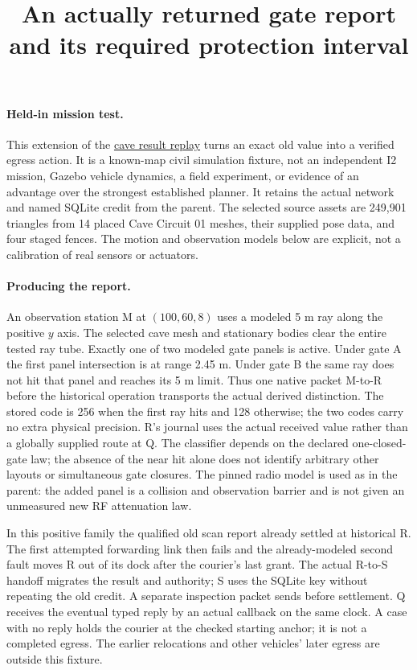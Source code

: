 \documentclass{article}
\title{An actually returned gate report and its required protection interval}
\author{}
\date{}
\begin{document}
\maketitle
\paragraph{Held-in mission test.}
This extension of the
\href{https://github.com/eternal-november/eos-research-programmes/pull/803}{cave result replay}
turns an exact old value into a verified egress action. It is a
known-map civil simulation fixture, not an independent I2
mission, Gazebo vehicle dynamics, a field experiment, or evidence
of an advantage over the strongest established planner.
It retains the actual network and named SQLite credit from the
parent. The selected source assets are 249,901 triangles from
14 placed Cave Circuit 01 meshes, their supplied pose data,
and four staged fences. The motion and observation models below
are explicit, not a calibration of real sensors or actuators.

\paragraph{Producing the report.}
An observation station M at \((100,60,8)\) uses a modeled
5 m ray along the positive \(y\) axis. The selected cave mesh
and stationary bodies clear the entire tested ray tube.
Exactly one of two modeled gate panels is active.
Under gate A the first panel intersection is at range 2.45 m.
Under gate B the same ray does not hit that panel and reaches
its 5 m limit. Thus one native packet M-to-R before the
historical operation transports the actual derived distinction.
The stored code is 256 when the first ray hits and 128 otherwise;
the two codes carry no extra physical precision. R's journal
uses the actual received value rather than a globally supplied
route at Q. The classifier depends on the declared one-closed-gate
law; the absence of the near hit alone does not identify
arbitrary other layouts or simultaneous gate closures. The
pinned radio model is used as in the parent: the added panel
is a collision and observation barrier and is not given an
unmeasured new RF attenuation law.

In this positive family the qualified old scan report already
settled at historical R. The first attempted forwarding link
then fails and the already-modeled second fault moves R out of
its dock after the courier's last grant. The actual R-to-S
handoff migrates the result and authority; S uses the SQLite
key without repeating the old credit. A separate inspection
packet sends before settlement. Q receives the eventual typed
reply by an actual callback on the same clock. A case with
no reply holds the courier at the checked starting anchor;
it is not a completed egress. The earlier relocations and
other vehicles' later egress are outside this fixture.
\end{document}
